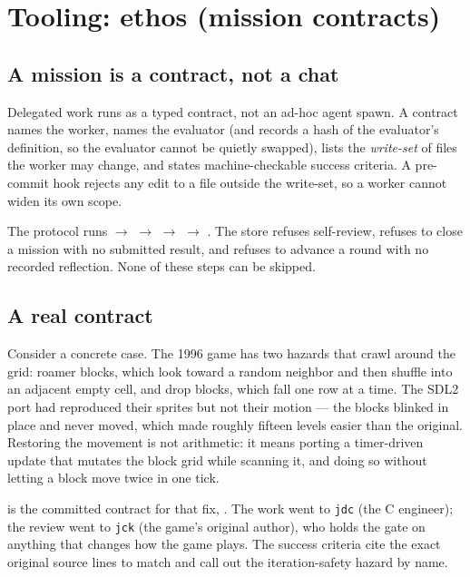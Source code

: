 \documentclass[11pt,a4paper]{article}
\begin{document}
\section{Tooling: ethos (mission contracts)}

\subsection{A mission is a contract, not a chat}

Delegated work runs as a typed contract, not an ad-hoc agent spawn. A
contract names the worker, names the evaluator (and records a hash of the
evaluator's definition, so the evaluator cannot be quietly swapped), lists
the \emph{write-set} of files the worker may change, and states
machine-checkable success criteria. A pre-commit hook rejects any edit to a
file outside the write-set, so a worker cannot widen its own scope.

The protocol runs  $\to$  $\to$ 
$\to$  $\to$ . The store refuses self-review,
refuses to close a mission with no submitted result, and refuses to advance
a round with no recorded reflection. None of these steps can be skipped.

\subsection{A real contract}

Consider a concrete case. The 1996 game has two hazards that crawl around
the grid: roamer blocks, which look toward a random neighbor and then shuffle
into an adjacent empty cell, and drop blocks, which fall one row at a time.
The SDL2 port had reproduced their sprites but not their motion --- the
blocks blinked in place and never moved, which made roughly fifteen levels
easier than the original. Restoring the movement is not arithmetic: it means
porting a timer-driven update that mutates the block grid while scanning it,
and doing so without letting a block move twice in one tick.

 is the committed contract for that fix,
. The work went to \texttt{jdc} (the C
engineer); the review went to \texttt{jck} (the game's original author), who
holds the gate on anything that changes how the game plays. The success
criteria cite the exact original source lines to match and call out the
iteration-safety hazard by name.
\end{document}
